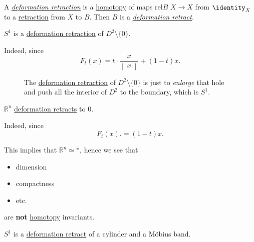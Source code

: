 \begin{prev}
	A \hyperref[def:deformation-retraction]{\emph{deformation retraction}} is a \hyperref[def:homotopy]{homotopy}
	of maps \(\mathrm{rel} B\) \(X\to X\) from \(\identity_X\) to a \hyperref[def:retraction]{retraction} from \(X\) to \(B\). Then \(B\) is a
	\hyperref[def:deformation-retraction]{\emph{deformation retract}}.
\end{prev}

\begin{eg}
	\(S^1\) is a \hyperref[def:deformation-retraction]{deformation retraction} of \(D^{2}\setminus \{0\}\).
\end{eg}
\begin{explanation}
	Indeed, since
	\[
		F_t(x) = t\cdot \frac{x}{\left\lVert x\right\rVert } + (1 - t)x.
	\]
	\begin{figure}[H]
		\centering
		\caption{The \hyperref[def:deformation-retraction]{deformation retraction} of \(D^{2}\setminus \{0\}\) is just to
			\emph{enlarge} that hole and push all the interior of \(D^2\) to the boundary, which is \(S^1\).}
		\label{fig:eg:punched-circle}
	\end{figure}
\end{explanation}
\begin{eg}
	\(\mathbb{R} ^n\) \hyperref[def:deformation-retraction]{deformation retracts} to \(0\).
\end{eg}
\begin{explanation}
	Indeed, since
	\[
		F_t(x). = (1 - t)x.
	\]
	\begin{remark}
		This implies that \(\mathbb{R} ^n\simeq *\), hence we see that
		\begin{itemize}
			\item dimension
			\item compactness
			\item etc.
		\end{itemize}
		are \textbf{not} \hyperref[def:homotopy]{homotopy} invariants.
	\end{remark}
\end{explanation}
\begin{eg}
	\(S^1\) is a \hyperref[def:deformation-retraction]{deformation retract} of a cylinder and a Möbius band.
\end{eg}
